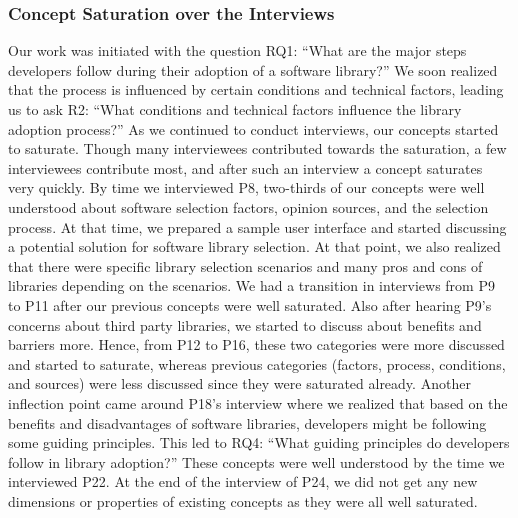 \subsubsection{Concept Saturation over the Interviews}
%
Our work was initiated with the question RQ1: ``What are the major steps developers follow during their adoption of a software library?'' We soon realized that the process is influenced by certain conditions and technical factors, leading us to ask R2: ``What conditions and technical factors influence the library adoption process?'' As we continued to conduct interviews, our concepts started to saturate. Though many interviewees contributed towards the saturation, a few interviewees contribute most, and after such an interview a concept saturates very quickly. By time we interviewed P8, two-thirds of our concepts were well understood about software selection factors, opinion sources, and the selection process. 
At that time, we prepared a sample user interface and started discussing a potential solution for software library selection. At that point, we also realized that there were specific library selection scenarios and many pros and cons of libraries depending on the scenarios. We had a transition in interviews from P9 to P11 after our previous concepts were well saturated. Also after hearing P9's concerns about third party libraries, we started to discuss about benefits and barriers more. Hence, from P12 to P16, these two categories were more discussed and started to saturate, whereas previous categories (factors, process, conditions, and sources) were less discussed since they were saturated already. Another inflection point came around P18's interview where we realized that based on the benefits and disadvantages of software libraries, developers might be following some guiding principles.
This led to RQ4: ``What guiding principles do developers follow in library adoption?'' These concepts were well understood by the time we interviewed P22. At the end of the interview of P24, we did not get any new dimensions or properties of existing concepts as they were all well saturated.



